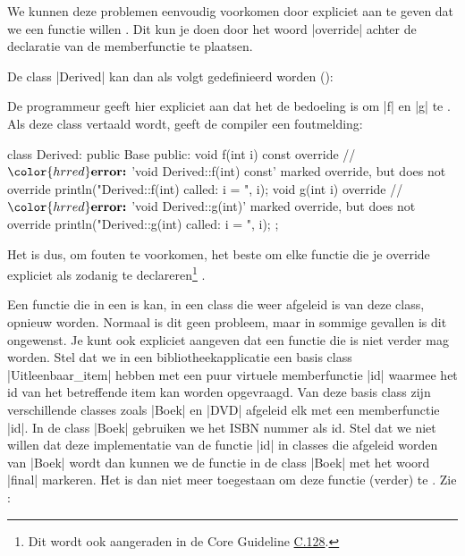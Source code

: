 \begin{cpplstShortInline}
We kunnen deze problemen eenvoudig voorkomen door expliciet aan te geven dat we een functie willen .
Dit kun je doen door het woord |override| achter de declaratie van de memberfunctie te plaatsen.

De class |Derived| kan dan als volgt gedefinieerd worden ():

De programmeur geeft hier expliciet aan dat het de bedoeling is om |f| en |g| te .
Als deze class vertaald wordt, geeft de compiler een foutmelding:
\begin{cpplstfragment}[mathescape=true]
class Derived: public Base {
public:
    void f(int i) const override {
//  $\color{hrred}\textbf{error:}$ 'void Derived::f(int) const' marked override, but does not override
        println("Derived::f(int) called: i = {}", i);
    }
    void g(int i) override {
//  $\color{hrred}\textbf{error:}$ 'void Derived::g(int)' marked override, but does not override
        println("Derived::g(int) called: i = {}", i);
    }
};
\end{cpplstfragment}

Het is dus, om fouten te voorkomen, het beste om elke functie die je override expliciet als zodanig te declareren\footnote{%
	Dit wordt ook aangeraden in de \Cpp{} Core Guideline \href{https://isocpp.github.io/CppCoreGuidelines/CppCoreGuidelines\#c128-virtual-functions-should-specify-exactly-one-of-virtual-override-or-final}{C.128}.
}
.
   
Een functie die in een   is kan, in een class die weer afgeleid is van deze class, opnieuw  worden.
Normaal is dit geen probleem, maar in sommige gevallen is dit ongewenst.
Je kunt ook expliciet aangeven dat een functie die  is niet verder  mag worden.
Stel dat we in een bibliotheekapplicatie een basis class |Uitleenbaar_item| hebben met een puur virtuele memberfunctie |id| waarmee het id van het betreffende item kan worden opgevraagd.
Van deze basis class zijn verschillende classes zoals |Boek| en |DVD| afgeleid elk met een  memberfunctie |id|.
In de class |Boek| gebruiken we het ISBN nummer als id.
Stel dat we niet willen dat deze implementatie van de functie |id| in classes die afgeleid worden van |Boek|  wordt dan kunnen we de functie in de class |Boek| met het woord |final| markeren.
Het is dan niet meer toegestaan om deze functie (verder) te . Zie :


\end{cpplstShortInline}
